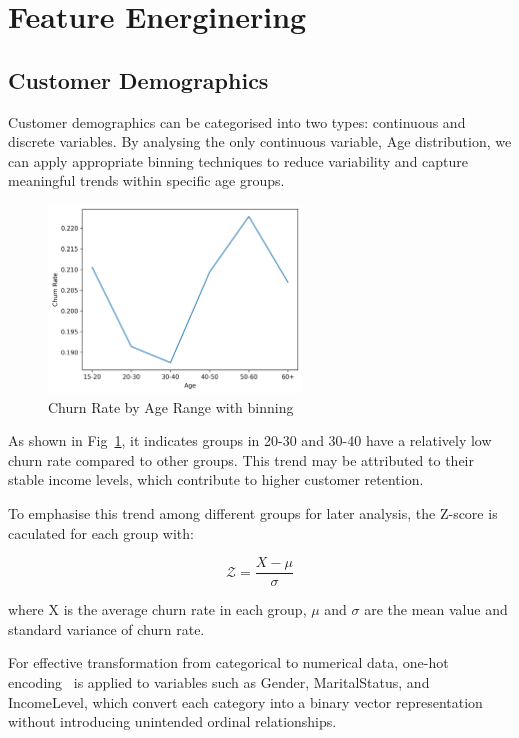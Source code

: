 \documentclass[journal=gmj]{CUP-JNL-DTM}%
\theoremstyle{definition}
\numberwithin{equation}{section}
\begin{document}
\section{Feature Energinering}

\subsection{Customer Demographics}

Customer demographics can be categorised into two types: continuous and discrete variables. By analysing the only continuous variable, Age distribution, we can apply appropriate binning techniques to reduce variability and capture meaningful trends within specific age groups.

\begin{figure}[h]
    \centering
    \includegraphics[width=0.6\textwidth]{Plots/agerange_churn_rate.png} 
    \caption{Churn Rate by Age Range with binning}
    \label{fig:agerange_churn}
\end{figure}

As shown in Fig~\ref{fig:agerange_churn}, it indicates groups in 20-30 and 30-40 have a relatively low churn rate compared to other groups. This trend may be attributed to their stable income levels, which contribute to higher customer retention.

To emphasise this trend among different groups for later analysis, the Z-score is caculated for each group with:

\begin{equation}
\mathcal{Z} =  \frac{X - \mu}{\sigma}
\label{eq1}
\end{equation}

where X is the average churn rate in each group, $\mu$ and $\sigma$ are the mean value and standard variance of churn rate.

For effective transformation from categorical to numerical data, one-hot encoding~\cite{poslavskaya2023encodingcategoricaldatahotter} is applied to variables such as Gender, MaritalStatus, and IncomeLevel, which convert each category into a binary vector representation without introducing unintended ordinal relationships.
\end{document}
